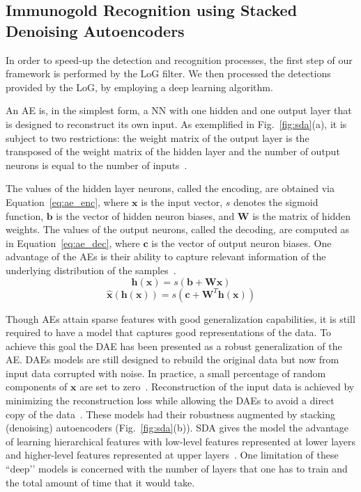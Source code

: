 \documentclass[a4paper,11pt]{article}
\newcommand{\1}{\mathbbm{1}}
\theoremstyle{plain}
\begin{document}
\subsection{Immunogold Recognition using Stacked Denoising Autoencoders}
In order to speed-up the detection and recognition processes, the first step of our framework is performed by the \ac{LoG} filter. We then processed the detections provided by the LoG, by employing a deep learning algorithm.

An \ac{AE} is, in the simplest form, a \ac{NN} with one hidden and one output layer that is designed to reconstruct its own input. As exemplified in Fig.~\ref{fig:sda}(a), it is subject to two restrictions: the weight matrix of the output layer is the transposed of the weight matrix of the hidden layer and the number of output neurons is equal to the number of inputs~\cite{Telmo2013}.

The values of the hidden layer neurons, called the encoding, are obtained via Equation~\ref{eq:ae_enc}, where $\mathbf{x}$ is the input vector, $s$ denotes the sigmoid function, $\mathbf{b}$ is the vector of hidden neuron biases, and $\mathbf{W}$ is the matrix of hidden weights. The values of the output neurons, called the decoding, are computed as in Equation~\ref{eq:ae_dec}, where $\mathbf{c}$ is the vector of output neuron biases. One advantage of the \acp{AE} is their ability to capture relevant information of the underlying distribution of the samples~\cite{rifai2011}.
\begin{equation}\label{eq:ae_enc}
    \textbf{h}(\textbf{x}) =s\left(\textbf{b}+\textbf{W}\textbf{x}\right)
\end{equation}
\begin{equation}\label{eq:ae_dec}
    \hat{\textbf{x}}(\textbf{h}(\textbf{x})) =s\left(\textbf{c}+\textbf{W}^{T}\textbf{h}(\textbf{x})\right)
\end{equation}

Though \acp{AE} attain sparse features with good generalization capabilities, it is still required to have a model that captures good representations of the data. To achieve this goal the \ac{DAE} has been presented as a robust generalization of the \ac{AE}. \acp{DAE} models are still designed to rebuild the original data but now from input data corrupted with noise. In practice, a small percentage of random components of $\textbf{x}$ are set to zero~\cite{Bengio2008}. Reconstruction of the input data is achieved by minimizing the reconstruction loss while allowing the \acp{DAE} to avoid a direct copy of the data~\cite{vincent2010}. These models had their robustness augmented by stacking (denoising) autoencoders (Fig.~\ref{fig:sda}(b)). \ac{SDA} gives the model the advantage of learning hierarchical features with low-level features represented at lower layers and higher-level features represented at upper layers~\cite[Section 3]{bengio2012deep,vincent2010}. One limitation of these ``deep’’ models is concerned with the number of layers that one has to train and the total amount of time that it would take.
\end{document}
